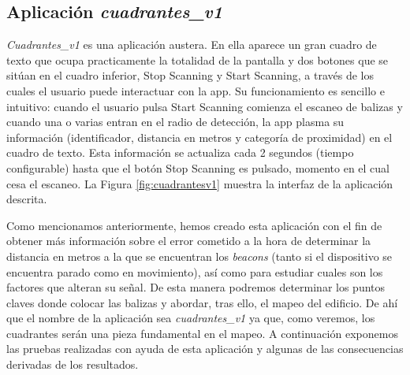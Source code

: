 \subsection{Aplicación \textit{cuadrantes\_v1}}
 \textit{Cuadrantes\_v1} es una aplicación austera. En ella aparece un gran cuadro de texto que ocupa practicamente la totalidad de la pantalla y dos botones que se sitúan en el cuadro inferior,  Stop Scanning y Start Scanning, a través de los cuales el usuario puede interactuar con la app. Su funcionamiento es sencillo e intuitivo: cuando el usuario pulsa Start Scanning comienza el escaneo de balizas y cuando una o varias entran en el radio de detección, la app plasma su información (identificador, distancia en metros y categoría de proximidad) en el cuadro de texto. Esta información se actualiza cada 2 segundos (tiempo configurable) hasta que el botón Stop Scanning es pulsado, momento en el cual cesa el escaneo. La Figura \ref{fig:cuadrantesv1} muestra la interfaz de la aplicación descrita.

Como mencionamos anteriormente, hemos creado esta aplicación con el fin de obtener más información sobre el error cometido a la hora de determinar la distancia en metros a la que se encuentran los \textit{beacons} (tanto si el dispositivo se encuentra parado como en movimiento), así como para estudiar cuales son los factores que alteran su señal. De esta manera podremos determinar los puntos claves donde colocar las balizas y abordar, tras ello, el mapeo del edificio. De ahí que el nombre de la aplicación sea \textit{cuadrantes\_v1} ya que, como veremos, los cuadrantes serán una pieza fundamental en el mapeo. A continuación exponemos las pruebas realizadas con ayuda de esta aplicación y algunas de las consecuencias derivadas de los resultados.

